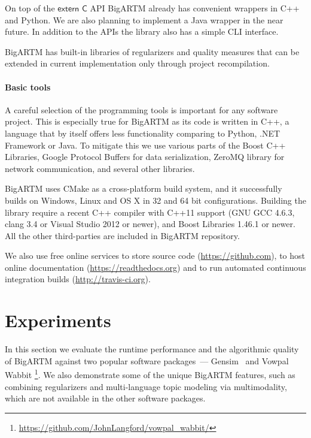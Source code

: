 \documentclass{sig-alternate}
\newcommand{\kw}[1]{\textsf{#1}}
\begin{document}
On top of the $\kw{extern C}$ API BigARTM already has convenient wrappers in C++ and Python.
We are also planning to implement a Java wrapper in the near future.
In addition to the APIs the library also has a simple CLI interface.

BigARTM has built-in libraries of regularizers and quality measures
that can be extended in current implementation only through project recompilation.

\paragraph{Basic tools}
A careful selection of the programming tools is important for any software project.
This is especially true for BigARTM as its code is written in C++,
a language that by itself offers less functionality comparing to Python, .NET Framework or Java.
To mitigate this we use
various parts of the Boost C++ Libraries,
Google Protocol Buffers for data serialization,
ZeroMQ library for network communication,
and several other libraries.

BigARTM uses CMake as a cross-platform build system,
and it successfully builds on Windows, Linux and OS X in 32 and 64 bit configurations.
Building the library require a recent C++ compiler with C++11 support (GNU GCC 4.6.3, clang 3.4 or Visual Studio 2012 or newer),
and Boost Libraries 1.46.1 or newer. All the other third-parties are included in BigARTM repository.

We also use free online services
to store source code (\url{https://github.com}),
to host online documentation (\url{https://readthedocs.org}) and
to run automated continuous integration builds (\url{http://travis-ci.org}).

\section{Experiments}
\label{sec:Experiments}

In this section we evaluate the runtime performance and the algorithmic quality of \mbox{BigARTM}
against two popular software packages~---
Gensim~\cite{rehurek10software}
and Vowpal Wabbit%
\footnote{\url{https://github.com/JohnLangford/vowpal_wabbit/}}.
We also demonstrate some of the unique BigARTM features, such as
combining regularizers and multi-language topic modeling via multimodality,
which are not available in the other software packages.
\end{document}
